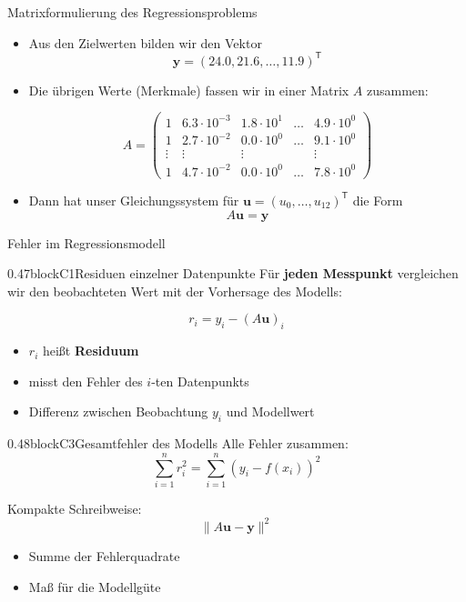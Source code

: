 \begin{frame}{Matrixformulierung des Regressionsproblems}

\begin{itemize}
\item Aus den Zielwerten bilden wir den Vektor
\[
\mathbf{y} = (24.0, 21.6, \ldots, 11.9)^{\mathsf{T}}
\]

\item Die übrigen Werte (Merkmale) fassen wir in einer Matrix $A$ zusammen:

\[
A =
\begin{pmatrix}
1 & 6.3\cdot 10^{-3} & 1.8\cdot 10^1 & \dots &  4.9\cdot 10^0 \\
1 & 2.7\cdot 10^{-2} & 0.0\cdot 10^0 & \dots &  9.1\cdot 10^0 \\
\vdots & \vdots & \vdots & &  \vdots \\
1 & 4.7\cdot 10^{-2} & 0.0\cdot 10^0 & \dots &  7.8\cdot 10^0
\end{pmatrix}
\]

\item Dann hat unser Gleichungssystem für \(\mathbf{u} = (u_0, \ldots, u_{12})^{\mathsf{T}}\) die Form 
\[
A \mathbf{u} = \mathbf{y}
\]
\end{itemize}

\end{frame}


\begin{frame}{Fehler im Regressionsmodell}


\begin{blockrow}
  \begin{blockcol}{0.47\linewidth}{blockC1}{Residuen einzelner Datenpunkte}
Für \textbf{jeden Messpunkt} vergleichen wir den beobachteten Wert
mit der Vorhersage des Modells:

\[
r_i = y_i - (A\mathbf{u})_i
\]

\begin{itemize}
\item $r_i$ heißt \textbf{Residuum}
\item misst den Fehler des $i$-ten Datenpunkts
\item Differenz zwischen Beobachtung $y_i$ und Modellwert
\end{itemize}
  \end{blockcol}

  \begin{blockcol}{0.48\linewidth}{blockC3}{Gesamtfehler des Modells}
   Alle Fehler zusammen:
\[
\sum_{i=1}^{n} r_i^2
= \sum_{i=1}^{n} (y_i - f(x_i))^2
\]

\medskip

Kompakte Schreibweise:
\[
\|A\mathbf{u} - \mathbf{y}\|^2
\]

\medskip

\begin{itemize}
\item Summe der Fehlerquadrate
\item Maß für die Modellgüte
\end{itemize}
  \end{blockcol}
\end{blockrow}


\end{frame}


